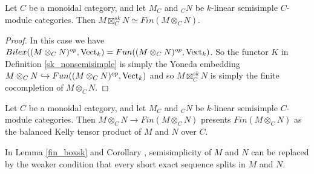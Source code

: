 \begin{lemma}\label{fin_boxsk}

  \noindent Let $C$ be a monoidal category, and let $M_C$ and $_{C}N$ be
  $k$-linear semisimple $C$-module categories. Then $M\boxtimes_C^{sk}N\simeq
  Fin(M\otimes_C N)$.
\end{lemma}

\begin{proof}
  In this case we have $Bilex((M\otimes_C N)^{op},\operatorname{Vect}_k)=Fun((M\otimes_C
  N)^{op},\operatorname{Vect}_k)$. So the functor $K$ in Definition \ref{sk_nonsemisimple}
  is simply the Yoneda embedding $M\otimes_C N\hookrightarrow Fun((M\otimes_C
  N)^{op},\operatorname{Vect}_k)$ and so $M\boxtimes_C^{sk} N$ is simply the finite
  cocompletion of $M\otimes_C N$.
\end{proof}

\begin{corollary}\label{fin_kelly}
  Let $C$ be a monoidal category, and let $M_C$ and $_{C}N$ be $k$-linear
  semisimple $C$-module categories. Then $M\otimes_CN\to Fin(M\otimes_C N)$
  presents $Fin(M\otimes_C N)$ as the balanced Kelly tensor product of $M$ and
  $N$ over $C$.
\end{corollary}

\begin{remark}
  In Lemma \ref{fin_boxsk} and Corollary \label{fin_kelly}, semisimplicity of
  $M$ and $N$ can be replaced by the weaker condition that every short exact
  sequence splits in $M$ and $N$.
\end{remark}


% 
% 
% 

